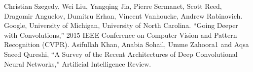 \documentclass[12pt]{report}
\begin{document}
	
	\newpage
	
	\begin{thebibliography}{10}
		Christian Szegedy, Wei Liu, Yangqing Jia, Pierre Sermanet, Scott Reed, Dragomir Anguelov, Dumitru Erhan, Vincent Vanhoucke, Andrew Rabinovich. Google, University of Michigan, University of North Carolina. \enquote{Going Deeper with Convolutions,} 2015 IEEE Conference on Computer Vision and Pattern Recognition (CVPR).
		Asifullah Khan, Anabia Sohail, Umme Zahoora1 and Aqsa Saeed Qureshi, \enquote{A Survey of the Recent Architectures of Deep Convolutional Neural Networks,} Artificial Intelligence Review.
	\end{thebibliography}
\end{document}
